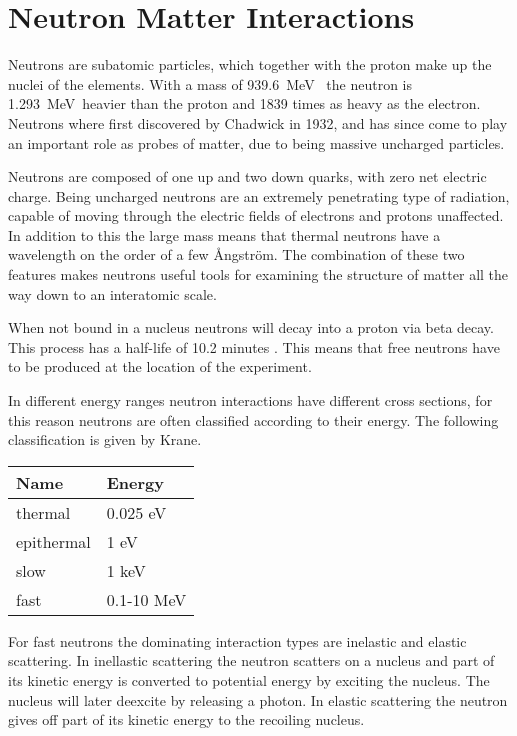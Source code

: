 \documentclass[main.tex]{subfiles}
\begin{document}
\section{Neutron Matter Interactions}\label{sec:neutronMatterInteractions}
Neutrons are subatomic particles, which together with the proton make up the nuclei of the elements. With a mass of \SI{939.6}{\MeV\;} the neutron is \SI{1.293}{\MeV\;}heavier than the proton and 1839 times as heavy as the electron. Neutrons where first discovered by Chadwick in 1932, and has since come to play an important role as probes of matter, due to being massive uncharged particles.

Neutrons are composed of one up and two down quarks, with zero net electric charge. Being uncharged neutrons are an extremely penetrating type of radiation, capable of moving through the electric fields of electrons and protons unaffected. In addition to this the large mass means that thermal neutrons have a wavelength on the order of a few Ångström. The combination of these two features makes neutrons useful tools for examining the structure of matter all the way down to an interatomic scale.

When not bound in a nucleus neutrons will decay into a proton via beta decay. This process has a half-life of 10.2 minutes \cite{Nudat}. This means that free neutrons have to be produced at the location of the experiment.

In different energy ranges neutron interactions have different cross sections, for this reason neutrons are often classified according to their energy. The following classification is given by Krane\cite[444]{Krane}.

\begin{table}[h]
\center
\begin{tabular}{|l|l|}
\hline
\textbf{Name} & \textbf{Energy} \\ \hline
thermal       & 0.025 eV        \\ \hline
epithermal    & 1 eV            \\ \hline
slow          & 1 keV           \\ \hline
fast          & 0.1-10 MeV      \\ \hline
\end{tabular}
\label{tab:neutron}
\end{table}

For fast neutrons the dominating interaction types are inelastic and elastic scattering. In inellastic scattering the neutron scatters on a nucleus and part of its kinetic energy is converted to potential energy by exciting the nucleus. The nucleus will later deexcite by releasing a photon. In elastic scattering the neutron gives off part of its kinetic energy to the recoiling nucleus\cite[pg.63]{Leo}.
\end{document}

